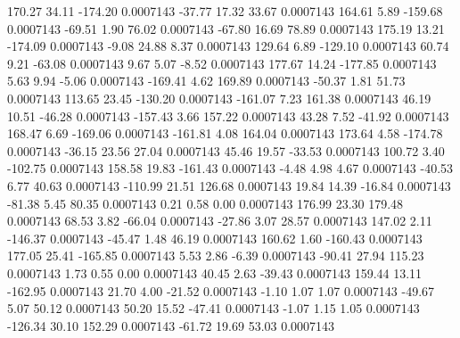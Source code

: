       170.27       34.11     -174.20     0.0007143
      -37.77       17.32       33.67     0.0007143
      164.61        5.89     -159.68     0.0007143
      -69.51        1.90       76.02     0.0007143
      -67.80       16.69       78.89     0.0007143
      175.19       13.21     -174.09     0.0007143
       -9.08       24.88        8.37     0.0007143
      129.64        6.89     -129.10     0.0007143
       60.74        9.21      -63.08     0.0007143
        9.67        5.07       -8.52     0.0007143
      177.67       14.24     -177.85     0.0007143
        5.63        9.94       -5.06     0.0007143
     -169.41        4.62      169.89     0.0007143
      -50.37        1.81       51.73     0.0007143
      113.65       23.45     -130.20     0.0007143
     -161.07        7.23      161.38     0.0007143
       46.19       10.51      -46.28     0.0007143
     -157.43        3.66      157.22     0.0007143
       43.28        7.52      -41.92     0.0007143
      168.47        6.69     -169.06     0.0007143
     -161.81        4.08      164.04     0.0007143
      173.64        4.58     -174.78     0.0007143
      -36.15       23.56       27.04     0.0007143
       45.46       19.57      -33.53     0.0007143
      100.72        3.40     -102.75     0.0007143
      158.58       19.83     -161.43     0.0007143
       -4.48        4.98        4.67     0.0007143
      -40.53        6.77       40.63     0.0007143
     -110.99       21.51      126.68     0.0007143
       19.84       14.39      -16.84     0.0007143
      -81.38        5.45       80.35     0.0007143
        0.21        0.58        0.00     0.0007143
      176.99       23.30      179.48     0.0007143
       68.53        3.82      -66.04     0.0007143
      -27.86        3.07       28.57     0.0007143
      147.02        2.11     -146.37     0.0007143
      -45.47        1.48       46.19     0.0007143
      160.62        1.60     -160.43     0.0007143
      177.05       25.41     -165.85     0.0007143
        5.53        2.86       -6.39     0.0007143
      -90.41       27.94      115.23     0.0007143
        1.73        0.55        0.00     0.0007143
       40.45        2.63      -39.43     0.0007143
      159.44       13.11     -162.95     0.0007143
       21.70        4.00      -21.52     0.0007143
       -1.10        1.07        1.07     0.0007143
      -49.67        5.07       50.12     0.0007143
       50.20       15.52      -47.41     0.0007143
       -1.07        1.15        1.05     0.0007143
     -126.34       30.10      152.29     0.0007143
      -61.72       19.69       53.03     0.0007143
